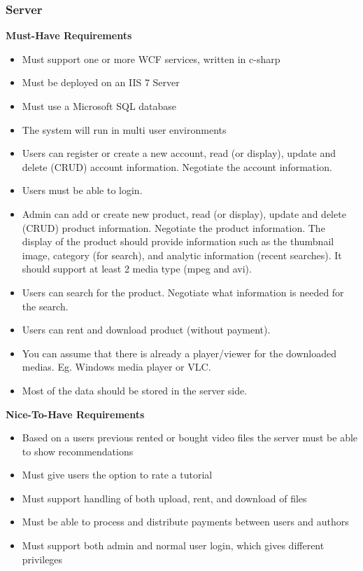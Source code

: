 \subsubsection{Server}

\textbf{Must-Have Requirements}
\begin{itemize}
	\item Must support one or more WCF services, written in c-sharp
	\item Must be deployed on an IIS 7 Server
	\item Must use a Microsoft SQL database
	\item The system will run in multi user environments
	\item Users can register or create a new account, read (or display), update and delete (CRUD) account information. 			Negotiate the account information.
	\item Users must be able to login.
	\item Admin can add or create new product, read (or display), update and delete (CRUD) product information. 				Negotiate the product information. The display of the product should provide information such as the thumbnail 			image, category (for search), and analytic information (recent searches). It should support at least 2 media type 			(mpeg and avi).
	\item Users can search for the product. Negotiate what information is needed for the search.
	\item Users can rent and download product (without payment).
	\item You can assume that there is already a player/viewer for the downloaded medias. Eg. Windows media player or 			VLC.
	\item Most of the data should be stored in the server side.
\end{itemize}
\textbf{Nice-To-Have Requirements}
\begin{itemize}
	\item Based on a users previous rented or bought video files the server must be able to show recommendations
	\item Must give users the option to rate a tutorial
	\item Must support handling of both upload, rent, and download of files
	\item Must be able to process and distribute payments between users and authors
	\item Must support both admin and normal user login, which gives different privileges
\end{itemize}

